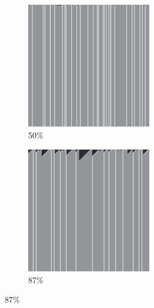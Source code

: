 \documentclass[12pt, fleqn]{report}                             %
\theoremstyle{break}                                            %
\begin{document}
\begin{figure}[ht!]
\begin{subfigure}[b]{0.4\linewidth}
          \includegraphics[width=0.6\textwidth]{Images/78/c.png}
          \caption{50\%}
        \end{subfigure}
        \begin{subfigure}[b]{0.4\linewidth}
          \includegraphics[width=0.6\textwidth]{Images/78/d.png}
          \caption{87\%}
        \end{subfigure}
      \end{figure}
\end{document}
